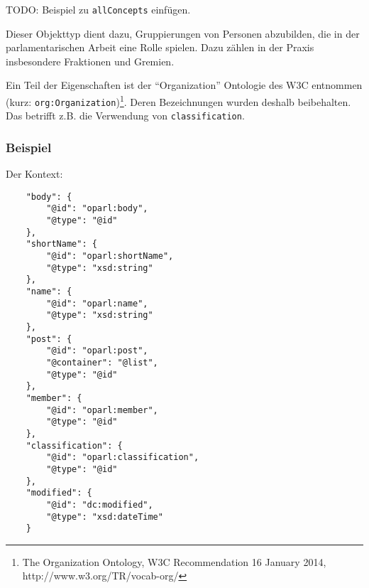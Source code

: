 \documentclass[,a4paper]{article}
\begin{document}
TODO: Beispiel zu \texttt{allConcepts} einfügen.


Dieser Objekttyp dient dazu, Gruppierungen von Personen abzubilden, die
in der parlamentarischen Arbeit eine Rolle spielen. Dazu zählen in der
Praxis insbesondere Fraktionen und Gremien.

Ein Teil der Eigenschaften ist der ``Organization'' Ontologie des W3C
entnommen (kurz: \texttt{org:Organization})\footnote{The Organization
  Ontology, W3C Recommendation 16 January 2014,
  http://www.w3.org/TR/vocab-org/}. Deren Bezeichnungen wurden deshalb
beibehalten. Das betrifft z.B. die Verwendung von
\texttt{classification}.

\subsubsection{Beispiel}\label{beispiel-2}

Der Kontext:

\begin{verbatim}
    "body": {
        "@id": "oparl:body",
        "@type": "@id"
    },
    "shortName": {
        "@id": "oparl:shortName",
        "@type": "xsd:string"
    },
    "name": {
        "@id": "oparl:name",
        "@type": "xsd:string"
    },
    "post": {
        "@id": "oparl:post",
        "@container": "@list",
        "@type": "@id"
    },
    "member": {
        "@id": "oparl:member",
        "@type": "@id"
    },
    "classification": {
        "@id": "oparl:classification",
        "@type": "@id"
    },
    "modified": {
        "@id": "dc:modified",
        "@type": "xsd:dateTime"
    }   
\end{verbatim}
\end{document}
